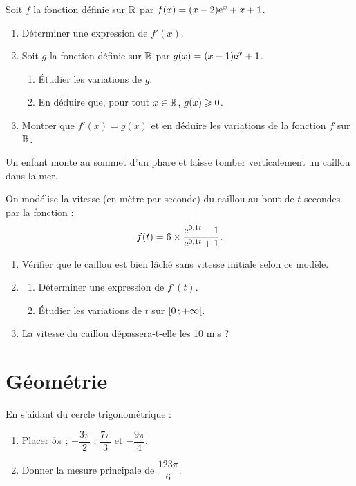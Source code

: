 \documentclass[a4paper,11pt]{article}
\begin{document}
\begin{cexercice}
Soit $f$ la fonction définie sur $\R$ par $f(x)=(x-2){\rm e}^x + x + 1$.
%
\begin{enumerate}
	\item Déterminer une expression de $f'(x)$.
	\item Soit $g$ la fonction définie sur $\R$ par $g(x) = (x - 1){\rm e}^x + 1$.
	\begin{enumerate}
		\item Étudier les variations de $g$.
		\item En déduire que, pour tout $x \in \R$, $g(x) \geqslant 0$.
	\end{enumerate}
	\item Montrer que $f'(x)=g(x)$ et en déduire les variations de la fonction $f$ sur $\R$.
\end{enumerate}
\end{cexercice}

\begin{cexercice}
Un enfant monte au sommet d’un phare et laisse tomber verticalement un caillou dans la mer.

On modélise la vitesse (en mètre par seconde) du caillou au bout de $t$ secondes par la fonction : \[ f(t)=6 \times \dfrac{{\rm e}^{0,1t}-1}{{\rm e}^{0,1t}+1}. \]
\begin{enumerate}
	\item Vérifier que le caillou est bien lâché sans vitesse initiale selon ce modèle.
	\item 
	\begin{enumerate}
		\item Déterminer une expression de $f'(t)$.
		\item Étudier les variations de $t$ sur $\mbox{\ensuremath{\left[0\mathpunct{};+\infty\right[}}$.
	\end{enumerate}
	\item La vitesse du caillou dépassera-t-elle les 10 m.s ?
\end{enumerate}
\end{cexercice}

\pagebreak

\section{Géométrie}

\begin{cexercice}
En s'aidant du cercle trigonométrique :
%
\begin{enumerate}[]
	\item Placer $5\pi$ ; $-\dfrac{3\pi}{2}$ ; $\dfrac{7\pi}{3}$ et $-\dfrac{9\pi}{4}$.
	\item Donner la mesure principale de $\dfrac{123\pi}{6}$.
\end{enumerate}
\end{cexercice}
\end{document}
